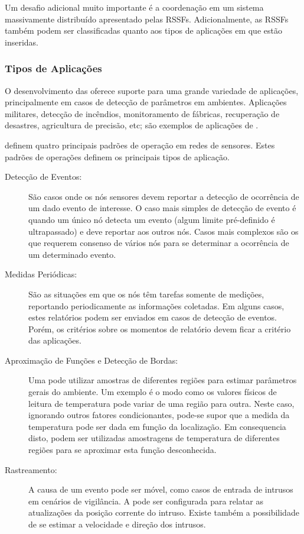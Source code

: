 Um desafio adicional muito importante é a coordenação em um sistema massivamente distribuído apresentado pelas RSSFs. Adicionalmente, as RSSFs também podem ser classificadas quanto aos tipos de aplicações em que estão inseridas.

\subsubsection{Tipos de Aplicações}
O desenvolvimento das \rssfs oferece suporte para uma grande variedade de aplicações, principalmente em casos de detecção de parâmetros em ambientes. Aplicações militares, detecção de incêndios, monitoramento de fábricas, recuperação de desastres, agricultura de precisão, etc; são exemplos de aplicações de \rssfs.

\cite{Holger2005} definem quatro principais padrões de operação em redes de sensores. Estes padrões de operações definem os principais tipos de aplicação.

\begin{description}

\item[Detecção de Eventos:] São casos onde os nós sensores devem reportar a detecção de ocorrência de um dado evento de interesse. O caso mais simples de detecção de evento é quando um único nó detecta um evento (algum limite pré-definido é ultrapassado) e deve reportar aos outros nós. Casos mais complexos são os que requerem consenso de vários nós para se determinar a ocorrência de um determinado evento.

\item[Medidas Periódicas: ] São as situações em que os nós têm tarefas somente de medições, reportando periodicamente as informações coletadas. Em alguns casos, estes relatórios podem ser enviados em casos de detecção de eventos. Porém, os critérios sobre os momentos de relatório devem ficar a critério das aplicações.

\item[Aproximação de Funções e Detecção de Bordas:] Uma \rssf pode utilizar amostras de diferentes regiões para estimar parâmetros gerais do ambiente. Um exemplo é o modo como os valores físicos de leitura de temperatura pode variar de uma região para outra. Neste caso, ignorando outros fatores condicionantes, pode-se supor que a medida da temperatura pode ser dada em função da localização. Em consequencia disto, podem ser utilizadas amostragens de temperatura de diferentes regiões para se aproximar esta função desconhecida.

\item[Rastreamento:] A causa de um evento pode ser móvel, como casos de entrada de intrusos em cenários de vigilância. A \rssf pode ser configurada para relatar as atualizações da posição corrente do intruso. Existe também a possibilidade de se estimar a velocidade e direção dos intrusos. 

\end{description}

